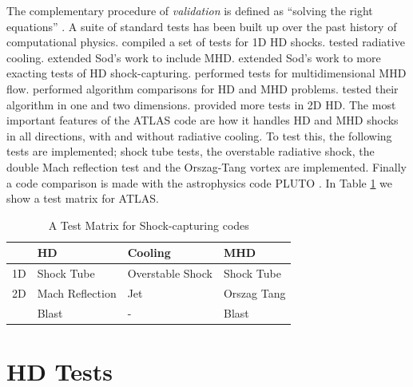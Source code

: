 The complementary procedure of \emph{validation} is defined as ``solving the right equations'' \citep{1976cfd..book.....R}.
A suite of standard tests has been built up over the past history of computational physics.
\citet{Sod78:_a_surv} compiled a set of tests for 1D HD shocks.
\citet{1982ApJ...261..543C} tested radiative cooling.
\citet{1988JCoPh..75..400B} extended Sod's work to include MHD.
\citet{Toro:1997:RSN} extended Sod's work to more exacting tests of HD shock-capturing.
\citet{1995ApJ...442..228R} performed tests for multidimensional MHD flow.
\citet{Toth96:_compar} performed algorithm comparisons for HD and MHD problems.
\citet{1998ApJ...494..317D} tested their algorithm in one and two dimensions.
\citet{2003_liska_wendroff} provided more tests in 2D HD.
The most important features of the ATLAS code are how it handles HD and MHD shocks in all directions, with and without radiative cooling.
To test this, the following tests are implemented; shock tube tests, the overstable radiative shock, the double Mach reflection test and the Orszag-Tang vortex are implemented.
Finally a code comparison is made with the astrophysics code PLUTO \citep{2004Ap&SS.293..199M}.
In Table \ref{tab:test} we show a test matrix for ATLAS.




\begin{table}
\begin{tabular}{|p{3.5cm}|p{3.5cm}|p{3.5cm}|p{3.5cm}|}
\hline
& HD  & Cooling & MHD  \\
\hline
1D & Shock Tube & Overstable Shock  & Shock Tube \\
\hline
2D & Mach Reflection & Jet  & Orszag Tang \\
 & Blast & -  & Blast \\
\hline
\end{tabular}
\caption{A Test Matrix for Shock-capturing codes}
\label{tab:test}
\end{table}


\section{HD Tests}



